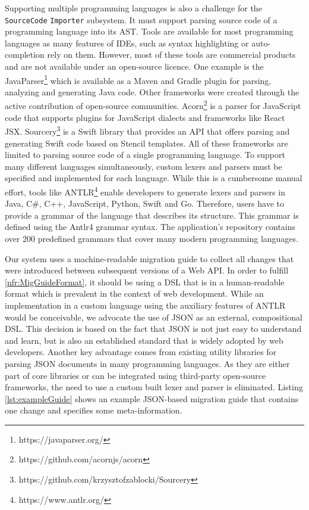  Supporting multiple programming languages is also a challenge for the \texttt{Source\-Code} \texttt{Importer} subsystem. It must support parsing source code of a programming language into its \ac{AST}. Tools are available for most programming languages as many features of \acp{IDE}, such as syntax highlighting or auto-completion rely on them. However, most of these tools are commercial products and are not available under an open-source licence. One example is the JavaParser\footnote{https://javaparser.org/} which is available as a Maven and Gradle plugin for parsing, analyzing and generating Java code. Other frameworks were created through the active contribution of open-source communities. Acorn\footnote{https://github.com/acornjs/acorn} is a parser for JavaScript code that supports plugins for JavaScript dialects and frameworks like React JSX. Sourcery\footnote{https://github.com/krzysztofzablocki/Sourcery} is a Swift library that provides an \ac{API} that offers parsing and generating Swift code based on Stencil templates. All of these frameworks are limited to parsing source code of a single programming language. To support many different languages simultaneously, custom lexers and parsers must be specified and implemented for each language. While this is a cumbersome manual effort, tools like \ac{ANTLR}\footnote{https://www.antlr.org/} enable developers to generate lexers and parsers in Java, C\#, C++, JavaScript, Python, Swift and Go. Therefore, users have to provide a grammar of the language that describes its structure. This grammar is defined using the Antlr4 grammar syntax. The application's repository contains over 200 predefined grammars that cover many modern programming languages.
 
 Our system uses a machine-readable migration guide to collect all changes that were introduced between subsequent versions of a Web API. In order to fulfill \ref{nfr:MigGuideFormat}, it should be using a \ac{DSL} that is in a human-readable format which is prevalent in the context of web development. While an implementation in a custom language using the auxiliary features of ANTLR would be conceivable, we advocate the use of \ac{JSON} as an external, compositional DSL. This decision is based on the fact that JSON is not just easy to understand and learn, but is also an established standard that is widely adopted by web developers. Another key advantage comes from existing utility libraries for parsing JSON documents in many programming languages. As they are either part of core libraries or can be integrated using third-party open-source frameworks, the need to use a custom built lexer and parser is eliminated. Listing \ref{lst:exampleGuide} shows an example JSON-based migration guide that contains one change and specifies some meta-information.
 
